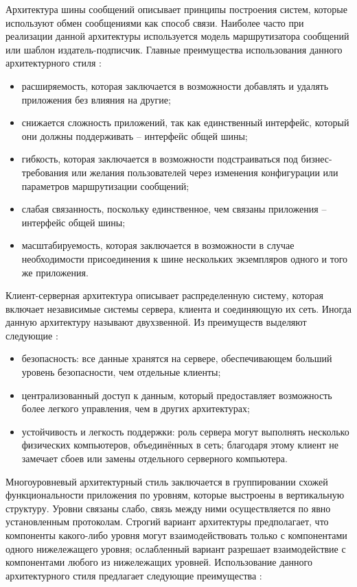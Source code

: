 Архитектура шины сообщений описывает принципы построения систем, которые используют обмен сообщениями как
способ связи. Наиболее часто при реализации данной архитектуры используется модель маршрутизатора сообщений или
шаблон издатель-подписчик. Главные преимущества использования данного архитектурного стиля
\cite{application_architecture_guide}:

\begin{itemize}
	\item расширяемость, которая заключается в возможности добавлять и удалять приложения без влияния на другие;
	\item снижается сложность приложений, так как единственный интерфейс, который они должны поддерживать -- интерфейс общей шины;
	\item гибкость, которая заключается в возможности подстраиваться под биз\-нес-требования или желания пользователей через изменения конфигурации или параметров маршрутизации сообщений;
	\item слабая связанность, поскольку единственное, чем связаны приложения -- интерфейс общей шины;
	\item масштабируемость, которая заключается в возможности в случае \linebreak необходимости присоединения к шине нескольких экземпляров одного и того же приложения.
\end{itemize}

Клиент-серверная архитектура описывает распределенную систему, которая включает независимые системы сервера,
клиента и соединяющую их сеть. Иногда данную архитектуру называют двухзвенной. Из преимуществ выделяют следующие \cite{architecture_volosevich}:

\begin{itemize}
	\item безопасность: все данные хранятся на сервере, обеспечивающем больший уровень безопасности, чем отдельные клиенты;
	\item централизованный доступ к данным, который предоставляет возможность более легкого управления, чем в других архитектурах;
	\item устойчивость и легкость поддержки: роль сервера могут выполнять несколько физических компьютеров, объединённых в сеть; благодаря этому клиент не замечает сбоев или замены отдельного серверного компьютера.
\end{itemize}

Многоуровневый архитектурный стиль заключается в группировании схожей функциональности приложения по уровням,
которые выстроены в вертикальную структуру. Уровни связаны слабо, связь между ними осуществляется по явно установленным
протоколам. Строгий вариант архитектуры предполагает, что компоненты какого-либо уровня могут взаимодействовать только
с компонентами одного нижележащего уровня; ослабленный вариант разрешает взаимодействие с компонентами любого из
нижележащих уровней. Использование данного архитектурного стиля предлагает следующие преимущества \cite{application_architecture_guide}:

